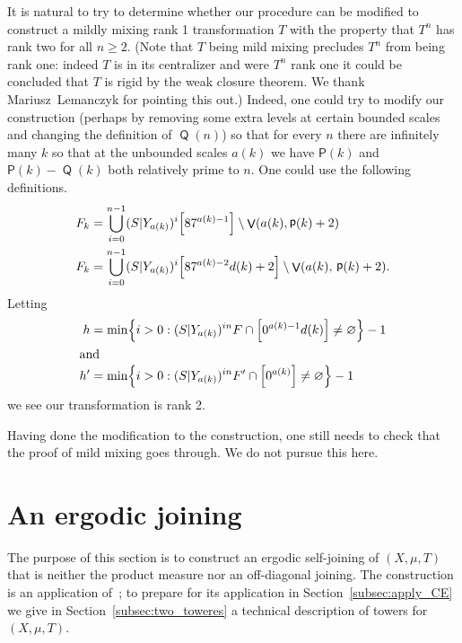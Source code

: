 \documentclass[AHL,Unicode,longabstracts,published]{cedram}
\DeclareMathOperator{\bad}{\mathsf{V}}
\DeclareMathOperator{\p}{\mathsf{p}}
\DeclareMathOperator{\Q}{\mathsf{Q}}
\renewcommand{\P}{\mathsf{P}}
\renewcommand{\emptyset}{\varnothing}
\let\originalleft\left
\let\originalright\right
\renewcommand{\left}{\mathopen{}\mathclose\bgroup\originalleft}
\renewcommand{\right}{\aftergroup\egroup\originalright}
\begin{document}
\begin{rema}\label{rem:rank two}
It is natural to try to determine whether our procedure can be modified to construct a mildly mixing rank 1 transformation $T$ with the property that $T^n$ has rank two for all $n\geq 2$. (Note that $T$ being mild mixing precludes $T^n$ from being rank one: indeed $T$ is in its centralizer and were $T^n$ rank one it could be concluded that $T$ is rigid by the weak closure theorem. We thank Mariusz~Lemanczyk for pointing this out.) Indeed, one could try to modify our construction (perhaps by removing some extra levels at certain bounded scales and changing the definition of $\Q(n)$) so that for every $n$ there are infinitely many $k$ so that at the unbounded scales $a(k)$ we have $\P(k)$ and $\P(k)-\Q(k)$ both relatively prime to $n$. One could use the following definitions.
\begin{align*}
F_k &=\bigcup_{i=0}^{n-1}(S|Y_{a(k)})^i\left[87^{a(k)-1}\right]\setminus \bad(a(k),\p(k)+2)
\\
F_k &=\bigcup_{i=0}^{n-1}(S|Y_{a(k)})^i\left[87^{a(k)-2}d(k)+2\right]\setminus \bad(a(k),\,\p(k)+2).
\end{align*}
Letting
\begin{align*}
h &=\min\left\{i>0:(S|Y_{a(k)})^{in}F \cap \left[0^{a(k)-1}d(k)\right] \neq \emptyset\right\}-1
\\
\intertext{and}
h' &=\min\left\{i>0:(S|Y_{a(k)})^{in}F' \cap
\left[0^{a(k)}\right] \neq \emptyset\right\}-1
\end{align*}
we see our transformation is rank 2.

Having done the modification to the construction, one still needs to check that the proof of mild mixing goes through. We do not pursue this here.
\end{rema}

\section{An ergodic joining}\label{sec:ergodic joining}

The purpose of this section is to construct an ergodic self-joining of $(X,\mu,T)$ that is neither the product measure nor an off-diagonal joining. The construction is an application of~\cite[Proposition~3.1]{MR4269425}; to prepare for its application in Section~\ref{subsec:apply_CE} we give in Section~\ref{subsec:two_toweres} a technical description of towers for $(X,\mu,T)$.
\end{document}
